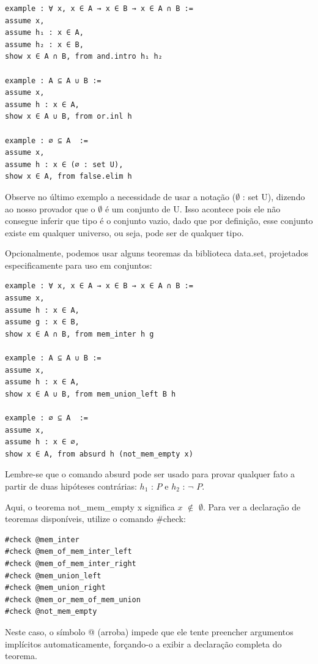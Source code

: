 \begin{lstlisting}
example : ∀ x, x ∈ A → x ∈ B → x ∈ A ∩ B :=
assume x,
assume h₁ : x ∈ A,
assume h₂ : x ∈ B,
show x ∈ A ∩ B, from and.intro h₁ h₂

example : A ⊆ A ∪ B :=
assume x,
assume h : x ∈ A,
show x ∈ A ∪ B, from or.inl h

example : ∅ ⊆ A  :=
assume x,
assume h : x ∈ (∅ : set U),
show x ∈ A, from false.elim h \end{lstlisting}

Observe no último exemplo a necessidade de usar a notação { \selectfont ($\emptyset$ : set U)}, dizendo ao nosso provador que o $\emptyset$ é um conjunto de{
\selectfont U}. Isso acontece pois ele não consegue inferir que tipo é o conjunto vazio, dado que por definição, esse conjunto existe em qualquer universo, ou seja, pode ser de qualquer tipo.

Opcionalmente, podemos usar alguns teoremas da biblioteca {
\selectfont data.set}, projetados especificamente para uso em conjuntos:

\begin{lstlisting}
example : ∀ x, x ∈ A → x ∈ B → x ∈ A ∩ B :=
assume x,
assume h : x ∈ A,
assume g : x ∈ B,
show x ∈ A ∩ B, from mem_inter h g

example : A ⊆ A ∪ B :=
assume x,
assume h : x ∈ A,
show x ∈ A ∪ B, from mem_union_left B h

example : ∅ ⊆ A  :=
assume x,
assume h : x ∈ ∅,
show x ∈ A, from absurd h (not_mem_empty x) \end{lstlisting}

Lembre-se que o comando{
\selectfont absurd} pode ser usado para provar qualquer fato a partir de duas hipóteses contrárias: $h_1$ : $P$ e $h_2$ : $\neg$ $P$.

Aqui, o teorema {
\selectfont not\_mem\_empty x} significa $x$ $\notin$ $\emptyset$. Para ver a declaração de teoremas disponíveis, utilize o comando{
\selectfont \#check}:
\begin{lstlisting}
#check @mem_inter
#check @mem_of_mem_inter_left
#check @mem_of_mem_inter_right
#check @mem_union_left
#check @mem_union_right
#check @mem_or_mem_of_mem_union
#check @not_mem_empty \end{lstlisting}

Neste caso, o símbolo{
\selectfont @} (arroba) impede que ele tente preencher argumentos implícitos automaticamente, forçando-o a exibir a declaração completa do teorema.

